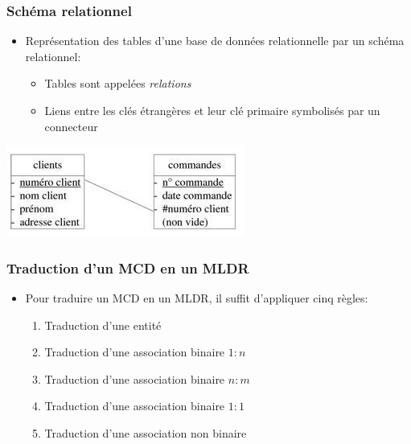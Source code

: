 \begin{frame}
  \frametitle{Schéma relationnel}
  \begin{itemize}
    \item Représentation des tables d'une base de données relationnelle par un schéma relationnel:
      \begin{itemize}
        \item Tables sont appelées \emph{relations}
        \item Liens entre les clés étrangères et leur clé primaire symbolisés par un connecteur
      \end{itemize}
    \end{itemize}
  \begin{center}
    \includegraphics[width=0.7\linewidth]{schema_relationnel.jpg}
  \end{center}
\end{frame}


\begin{frame}
  \frametitle{Traduction d'un MCD en un MLDR}
  \begin{itemize}
    \item Pour traduire un MCD en un MLDR, il suffit d'appliquer cinq règles:
      \begin{enumerate}
        \item Traduction d'une entité
        \item Traduction d'une association binaire $1:n$
        \item Traduction d'une association binaire $n:m$
        \item Traduction d'une association binaire $1:1$
        \item Traduction d'une association non binaire
      \end{enumerate}
  \end{itemize}
\end{frame}

